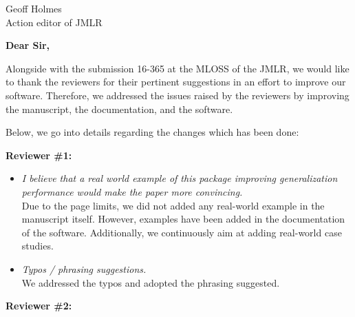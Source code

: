 \documentclass{letter}
\begin{document}

\begin{letter}{Geoff Holmes \\ Action editor of JMLR} %


  \opening{\textbf{Dear Sir,}}

  Alongside with the submission 16-365 at the MLOSS of the JMLR, we
  would like to thank the reviewers for their pertinent suggestions in
  an effort to improve our software.
  Therefore, we addressed the issues raised by the reviewers by
  improving the manuscript, the documentation, and the software.

  Below, we go into details regarding the changes which has been done:

  \textbf{Reviewer \#1:}

  \begin{itemize}
  \item \textit{I believe that a real world example of this package
      improving generalization performance would make the paper more
      convincing.}\\
    Due to the page limits, we did not added any real-world example in
    the manuscript itself. However, examples have been added in the
    documentation of the software. Additionally, we continuously aim
    at adding real-world case studies.
  \item \textit{Typos / phrasing suggestions.}\\
    We addressed the typos and adopted the phrasing suggested.
  \end{itemize}

  \textbf{Reviewer \#2:}


\end{letter}
\end{document}
